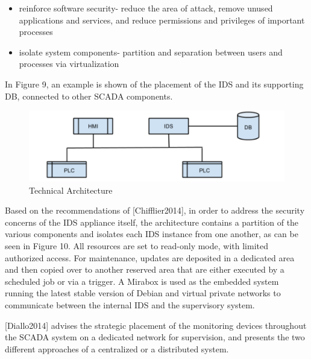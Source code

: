\documentclass[12pt,]{article}
\begin{document}
\begin{itemize}
\itemsep1pt\parskip0pt
\item
  reinforce software security- reduce the area of attack, remove unused
  applications and services, and reduce permissions and privileges of
  important processes
\item
  isolate system components- partition and separation between users and
  processes via virtualization
\end{itemize}

In Figure 9, an example is shown of the placement of the IDS and its
supporting DB, connected to other SCADA components.

\begin{figure}

{\centering \includegraphics{thesis_files/figure-latex/unnamed-chunk-38-1} 

}

\caption{Technical Architecture}\label{fig:unnamed-chunk-38}
\end{figure}

Based on the recommendations of {[}Chifflier2014{]}, in order to address
the security concerns of the IDS appliance itself, the architecture
contains a partition of the various components and isolates each IDS
instance from one another, as can be seen in Figure 10. All resources
are set to read-only mode, with limited authorized access. For
maintenance, updates are deposited in a dedicated area and then copied
over to another reserved area that are either executed by a scheduled
job or via a trigger. A Mirabox is used as the embedded system running
the latest stable version of Debian and virtual private networks to
communicate between the internal IDS and the supervisory system.

{[}Diallo2014{]} advises the strategic placement of the monitoring
devices throughout the SCADA system on a dedicated network for
supervision, and presents the two different approaches of a centralized
or a distributed system.
\end{document}
